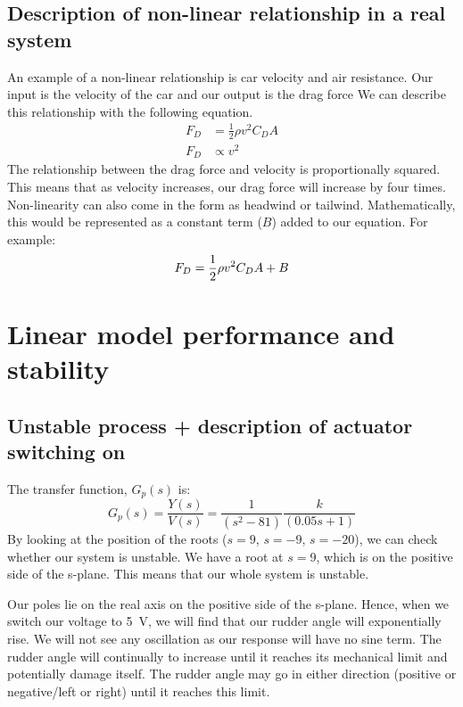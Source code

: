 \documentclass[11pt]{article}
\numberwithin{equation}{section}
\begin{document}
\subsection{Description of non-linear relationship in a real system}
An example of a non-linear relationship is car velocity and air resistance. Our input is the velocity of the car and our output is the drag force We can describe this relationship with the following equation.
\begin{align}
    F_D & = \frac{1}{2} \rho v^2 C_D A \\
    F_D & \propto v^2
\end{align}
The relationship between the drag force and velocity is proportionally squared. This means that as velocity increases, our drag force will increase by four times. Non-linearity can also come in the form as headwind or tailwind. Mathematically, this would be represented as a constant term ($B$) added to our equation. For example:
\begin{equation}
    F_D = \frac{1}{2} \rho v^2 C_D A + B\\
\end{equation}
\section{Linear model performance and stability}
\subsection{Unstable process + description of actuator switching on}
The transfer function, $G_p(s)$ is:
\begin{equation}
    G_p (s) = \frac{Y(s)}{V(s)} = \frac{1}{\left(s^2 - 81\right)}\frac{k}{\left(0.05s + 1\right)}
\end{equation}
By looking at the position of the roots ($s = 9$, $s = -9$, $s = -20$), we can check whether our system is unstable. We have a root at $s = 9$, which is on the positive side of the s-plane. This means that our whole system is unstable.

Our poles lie on the real axis on the positive side of the s-plane. Hence, when we switch our voltage to \SI{5}{\volt}, we will find that our rudder angle will exponentially rise. We will not see any oscillation as our response will have no sine term. The rudder angle will continually to increase until it reaches its mechanical limit and potentially damage itself. The rudder angle may go in either direction (positive or negative/left or right) until it reaches this limit.
\end{document}
